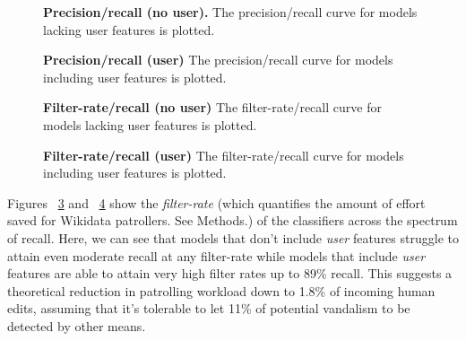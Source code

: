 \documentclass{sig-alternate-2013}
\begin{document}
\begin{figure}
\centering
{}
\caption{\textbf{Precision/recall (no user).} The precision/recall curve for models lacking user features is plotted.}
\label{fig:precision_recall_no_user}
\end{figure}

\begin{figure}
\centering
{}
\caption{\textbf{Precision/recall (user)} The precision/recall curve for models including user features is plotted.}
\label{fig:precision_recall_user}
\end{figure}

\begin{figure}
\centering
{}
\caption{\textbf{Filter-rate/recall (no user)} The filter-rate/recall curve for models lacking user features is plotted.}
\label{fig:filter_rate_no_user}
\end{figure}

\begin{figure}
\centering
{}
\caption{\textbf{Filter-rate/recall (user)} The filter-rate/recall curve for models including user features is plotted.}
\label{fig:filter_rate_user}
\end{figure}


Figures ~\ref{fig:filter_rate_no_user} and ~\ref{fig:filter_rate_user} show the \textit{filter-rate} (which quantifies the amount of effort saved for Wikidata patrollers.  See Methods.) of the classifiers across the spectrum of recall.  Here, we can see that models that don't include \textit{user} features struggle to attain even moderate recall at any filter-rate while models that include \textit{user} features are able to attain very high filter rates up to 89\% recall.  This suggests a theoretical reduction in patrolling workload down to 1.8\% of incoming human edits, assuming that it's tolerable to let 11\% of potential vandalism to be detected by other means.
\end{document}
